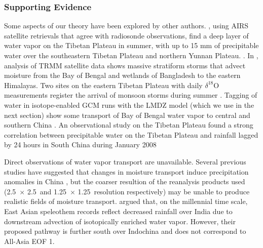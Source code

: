 \documentclass[12pt]{article}
\begin{document}
\subsubsection{Supporting Evidence}

	Some aspects of our theory have been explored by other authors. \cite{Zhang2013}, using AIRS satellite retrievals that agree with radiosonde observations, find a deep layer of water vapor on the Tibetan Plateau in summer, with up to 15 mm of precipitable water over the southeastern Tibetan Plateau and northern Yunnan Plateau. . In \cite{Medina2010}, analysis of TRMM satellite data shows massive stratiform storms that advect moisture from the Bay of Bengal and wetlands of Bangladesh to the eastern Himalayas. Two sites on the eastern Tibetan Plateau with daily ${\delta}^{18}$O measurements register the arrival of monsoon storms during summer \citep{Gao2011}. Tagging of water in isotope-enabled GCM runs with the LMDZ model (which we use in the next section) show some transport of Bay of Bengal water vapor to central and southern China \citep{Yao2013}. An observational study on the Tibetan Plateau found a strong correlation between precipitable water on the Tibetan Plateau and rainfall lagged by 24 hours in South China during January 2008\citep{Zhang2012} 

	
	Direct observations of water vapor transport are unavailable. Several previous studies have suggested that changes in moisture transport induce precipitation anomalies in China \citep{Feng2012,Cao2014}, but the coarser resultion of the reanalysis products used (2.5\textdegree\ $\times$ 2.5\textdegree\ and 1.25\textdegree\ $\times$ 1.25\textdegree\ resolution respectively) may be unable to produce realistic fields of moisture transport. \cite{Pausata2011} argued that, on the millennial time scale, East Asian speleothem records reflect decreased rainfall over India due to downstream advection of isotopically enriched water vapor. However, their proposed pathway is further south over Indochina and does not correspond to All-Asia EOF 1.
\end{document}

